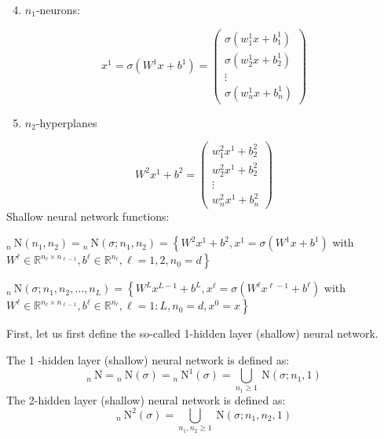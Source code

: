 \documentclass[10pt]{article}
\begin{document}
  \begin{enumerate}
    \setcounter{enumii}{3}
    \item $n_{1}$-neurons:
  \end{enumerate}
$$
x^{1}=\sigma\left(W^{1} x+b^{1}\right)=\left(\begin{array}{c}
\sigma\left(w_{1}^{1} x+b_{1}^{1}\right) \\
\sigma\left(w_{2}^{1} x+b_{2}^{1}\right) \\
\vdots \\
\sigma\left(w_{n}^{1} x+b_{n}^{1}\right)
\end{array}\right)
$$

  \begin{enumerate}
    \setcounter{enumii}{4}
    \item $n_{2}$-hyperplanes
  \end{enumerate}
$$
W^{2} x^{1}+b^{2}=\left(\begin{array}{c}
w_{1}^{2} x^{1}+b_{2}^{2} \\
w_{2}^{2} x^{1}+b_{2}^{2} \\
\vdots \\
w_{n}^{2} x^{1}+b_{n}^{2}
\end{array}\right)
$$
Shallow neural network functions:

${ }_{n} \mathrm{~N}\left(n_{1}, n_{2}\right)={ }_{n} \mathrm{~N}\left(\sigma ; n_{1}, n_{2}\right)=\left\{W^{2} x^{1}+b^{2}, x^{1}=\sigma\left(W^{1} x+b^{1}\right)\right.$ with $\left.W^{\ell} \in \mathbb{R}^{n_{\ell} \times n_{\ell-1}}, b^{\ell} \in \mathbb{R}^{n_{\ell}}, \ell=1,2, n_{0}=d\right\}$

${ }_{n} \mathrm{~N}\left(\sigma ; n_{1}, n_{2}, \ldots, n_{L}\right)=\left\{W^{L} x^{L-1}+b^{L}, x^{\ell}=\sigma\left(W^{\ell} x^{\ell-1}+b^{\ell}\right)\right.$ with $\left.W^{\ell} \in \mathbb{R}^{n_{\ell} \times n_{\ell-1}}, b^{\ell} \in \mathbb{R}^{n_{\ell}}, \ell=1: L, n_{0}=d, x^{0}=x\right\}$

First, let us first define the so-called 1-hidden layer (shallow) neural network.

The 1 -hidden layer (shallow) neural network is defined as:
$$
{ }_{n} \mathrm{~N}={ }_{n} \mathrm{~N}(\sigma)={ }_{n} \mathrm{~N}^{1}(\sigma)=\bigcup_{n_{1} \geq 1} \mathrm{~N}\left(\sigma ; n_{1}, 1\right)
$$
The 2-hidden layer (shallow) neural network is defined as:
$$
{ }_{n} \mathrm{~N}^{2}(\sigma)=\bigcup_{n_{1}, n_{2} \geq 1} \mathrm{~N}\left(\sigma ; n_{1}, n_{2}, 1\right)
$$
\end{document}
